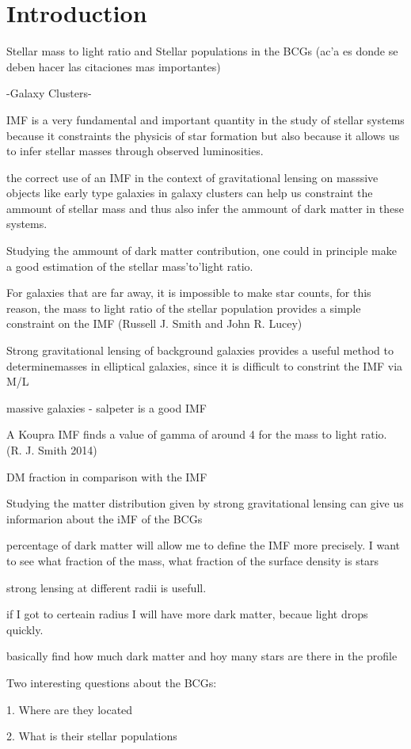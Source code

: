 \chapter{Introduction}

Stellar mass to light ratio and Stellar populations in the BCGs (ac'a es donde se deben hacer las citaciones mas importantes)

-Galaxy Clusters-

IMF is a very fundamental and important quantity in the study of stellar systems because it constraints the physicis of star formation but also because it allows us to infer stellar masses through observed luminosities.

the correct use of an IMF in the context of gravitational lensing on masssive objects like early type galaxies in galaxy clusters can help us constraint the ammount of stellar mass and thus also infer the ammount of dark matter in these systems.

Studying the ammount of dark matter contribution, one could in principle make a good estimation of the stellar mass'to'light ratio.

For galaxies that are far away, it is impossible to make star counts, for this reason, the mass to light ratio of the stellar population provides a simple constraint on the IMF (Russell J. Smith and John R. Lucey) 

Strong gravitational lensing of background galaxies provides a useful method to determinemasses in elliptical galaxies, since it is difficult to constrint the IMF via M/L

massive galaxies - salpeter is a good IMF

A Koupra IMF finds a value of gamma of around 4 for the mass to light ratio. (R. J. Smith 2014) 

DM fraction in comparison with the IMF 

Studying the matter distribution given by strong gravitational lensing can give us informarion about the iMF of the BCGs

percentage of dark matter will allow me to define the IMF more precisely. I want to see what fraction of the mass, what fraction of the surface density is stars

strong lensing at different radii is usefull.

if I got to certeain radius I will have more dark matter, becaue light drops quickly. 

basically find how much dark matter and hoy many stars are there in the profile

Two interesting questions about the BCGs:

1. Where are they located

2. What is their stellar populations


\newpage
